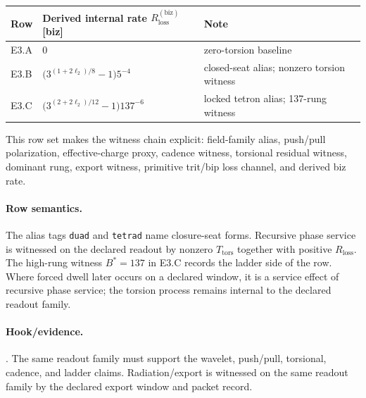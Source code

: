 {\footnotesize
\begin{center}
\begin{tabular}{@{}lll@{}}
\toprule
Row & Derived internal rate $R_{\mathrm{loss}}^{(\mathrm{biz})}$ [biz] & Note \\
\midrule
E3.A & $0$ & zero-torsion baseline \\
E3.B & $\bigl(3^{(1+2\ell_2)/8}-1\bigr)5^{-4}$ & closed-seat alias; nonzero torsion witness \\
E3.C & $\bigl(3^{(2+2\ell_2)/12}-1\bigr)137^{-6}$ & locked tetron alias; 137-rung witness \\
\bottomrule
\end{tabular}
\end{center}}

This row set makes the witness chain explicit: field-family alias, push/pull polarization, effective-charge proxy, cadence witness, torsional residual witness, dominant rung, export witness, primitive trit/bip loss channel, and derived biz rate.
\paragraph{Row semantics.} The alias tags \texttt{duad} and \texttt{tetrad} name closure-seat forms. Recursive phase service is witnessed on the declared readout by nonzero $T_{\mathrm{tors}}$ together with positive $R_{\mathrm{loss}}$. The high-rung witness $B^*=137$ in E3.C records the ladder side of the row. Where forced dwell later occurs on a declared window, it is a service effect of recursive phase service; the torsion process remains internal to the declared readout family.

\paragraph{Hook/evidence.} . The same readout family must support the wavelet, push/pull, torsional, cadence, and ladder claims. Radiation/export is witnessed on the same readout family by the declared export window and packet record.
